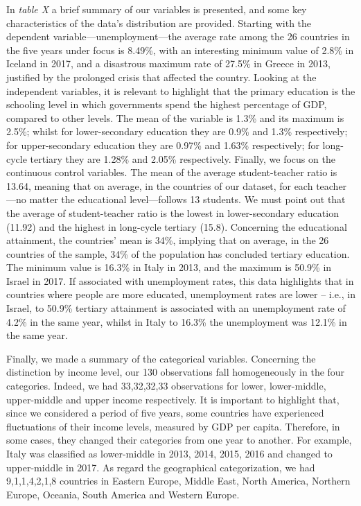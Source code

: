 \documentclass[
]{article}
\begin{document}
In \emph{table X} a brief summary of our variables is presented, and
some key characteristics of the data's distribution are provided.
Starting with the dependent variable---unemployment---the average rate
among the 26 countries in the five years under focus is 8.49\%, with an
interesting minimum value of 2.8\% in Iceland in 2017, and a disastrous
maximum rate of 27.5\% in Greece in 2013, justified by the prolonged
crisis that affected the country. Looking at the independent variables,
it is relevant to highlight that the primary education is the schooling
level in which governments spend the highest percentage of GDP, compared
to other levels. The mean of the variable is 1.3\% and its maximum is
2.5\%; whilst for lower-secondary education they are 0.9\% and 1.3\%
respectively; for upper-secondary education they are 0.97\% and 1.63\%
respectively; for long-cycle tertiary they are 1.28\% and 2.05\%
respectively. Finally, we focus on the continuous control variables. The
mean of the average student-teacher ratio is 13.64, meaning that on
average, in the countries of our dataset, for each teacher---no matter
the educational level---follows 13 students. We must point out that the
average of student-teacher ratio is the lowest in lower-secondary
education (11.92) and the highest in long-cycle tertiary (15.8).
Concerning the educational attainment, the countries' mean is 34\%,
implying that on average, in the 26 countries of the sample, 34\% of the
population has concluded tertiary education. The minimum value is 16.3\%
in Italy in 2013, and the maximum is 50.9\% in Israel in 2017. If
associated with unemployment rates, this data highlights that in
countries where people are more educated, unemployment rates are lower
-- i.e., in Israel, to 50.9\% tertiary attainment is associated with an
unemployment rate of 4.2\% in the same year, whilst in Italy to 16.3\%
the unemployment was 12.1\% in the same year.

Finally, we made a summary of the categorical variables. Concerning the
distinction by income level, our 130 observations fall homogeneously in
the four categories. Indeed, we had 33,32,32,33 observations for lower,
lower-middle, upper-middle and upper income respectively. It is
important to highlight that, since we considered a period of five years,
some countries have experienced fluctuations of their income levels,
measured by GDP per capita. Therefore, in some cases, they changed their
categories from one year to another. For example, Italy was classified
as lower-middle in 2013, 2014, 2015, 2016 and changed to upper-middle in
2017. As regard the geographical categorization, we had 9,1,1,4,2,1,8
countries in Eastern Europe, Middle East, North America, Northern
Europe, Oceania, South America and Western Europe.
\end{document}

